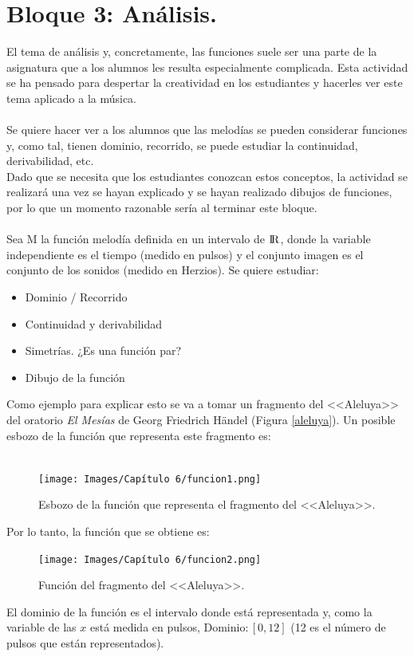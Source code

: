 \documentclass[a4paper, openright, 11pt, titlepage]{report}
\theoremstyle{definition}\newtheorem{defin}[propo]{Definition}
\theoremstyle{definition}\newtheorem{obser}[propo]{Remark}
\theoremstyle{definition}\newtheorem{ejem}[propo]{Ejemplo}
\theoremstyle{definition}\newtheorem{algoritmo}[propo]{Algoritmo}
\begin{document}
\section{Bloque 3: Análisis.}
El tema de análisis y, concretamente, las funciones suele ser una parte de la asignatura que a los alumnos les resulta especialmente complicada. Esta actividad se ha pensado para despertar la creatividad en los estudiantes y hacerles ver este tema aplicado a la música.\\\\
Se quiere hacer ver a los alumnos que las melodías se pueden considerar funciones y, como tal, tienen dominio, recorrido, se puede estudiar la continuidad, derivabilidad, etc. \\
Dado que se necesita que los estudiantes conozcan estos conceptos, la actividad se realizará una vez se hayan explicado y se hayan realizado dibujos de funciones, por lo que un momento razonable sería al terminar este bloque.\\\\
Sea M la función melodía definida en un intervalo de ${\rm I\!R}$, donde la variable independiente es el tiempo (medido en pulsos) y el conjunto imagen es el conjunto de los sonidos (medido en Herzios). Se quiere estudiar:
\begin{itemize}
    \item Dominio / Recorrido
    \item Continuidad y derivabilidad
    \item Simetrías. ¿Es una función par?
    \item Dibujo de la función
\end{itemize}
Como ejemplo para explicar esto se va a tomar un fragmento del <<Aleluya>> del oratorio \textit{El Mesías} de Georg Friedrich Händel (Figura \ref{aleluya}). Un posible esbozo de la función que representa este fragmento es:\\\\
\begin{figure}[H]
    \centering
    \texttt{[image: Images/Capítulo 6/funcion1.png]}
    \caption{Esbozo de la función que representa el fragmento del <<Aleluya>>.}
\end{figure}
Por lo tanto, la función que se obtiene es:
\begin{figure}[H]
    \centering
    \texttt{[image: Images/Capítulo 6/funcion2.png]}
    \caption{Función del fragmento del <<Aleluya>>.}
    \label{funcion}
\end{figure}
El dominio de la función es el intervalo donde está representada y, como la variable de las $x$ está medida en pulsos, $\boxed{\text{Dominio}: [0, 12]}$ (12 es el número de pulsos que están representados).\\
\end{document}
